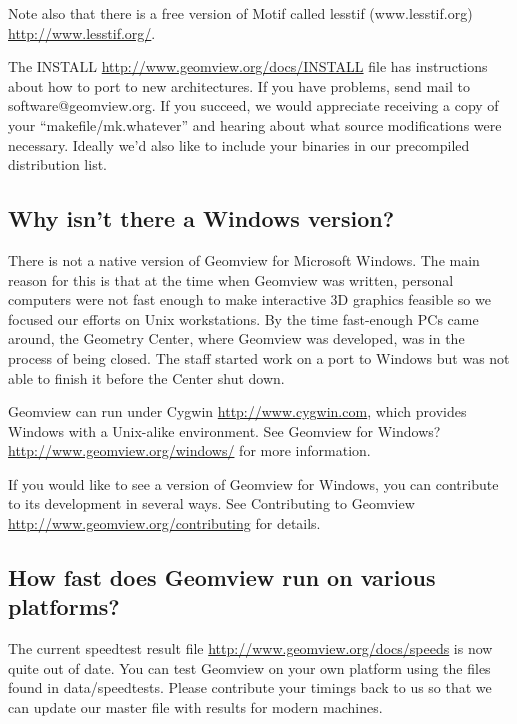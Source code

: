 \documentclass[12pt,a4paper]{article}
\begin{document}
        Note also that there is a free version of Motif called lesstif
        (www.lesstif.org) \url{http://www.lesstif.org/}.

        The INSTALL \url{http://www.geomview.org/docs/INSTALL} file has instructions
        about how to port to new architectures. If you have problems, send mail
        to software@geomview.org. If you succeed,
        we would appreciate receiving a copy of your ``makefile/mk.whatever'' and
        hearing about what source modifications were necessary. Ideally we'd
        also like to include your binaries in our precompiled distribution list.

    \subsection{Why isn't there a Windows version?}

        There is not a native version of Geomview for Microsoft Windows. The
        main reason for this is that at the time when Geomview was written,
        personal computers were not fast enough to make interactive 3D graphics
        feasible so we focused our efforts on Unix workstations. By the time
        fast-enough PCs came around, the Geometry Center, where Geomview was
        developed, was in the process of being closed. The staff started work on
        a port to Windows but was not able to finish it before the Center shut
        down.

        Geomview can run under Cygwin \url{http://www.cygwin.com}, which provides
        Windows with a Unix-alike environment. See Geomview for Windows?
        \url{http://www.geomview.org/windows/} for more information.

        If you would like to see a version of Geomview for Windows, you can
        contribute to its development in several ways. See Contributing to
        Geomview \url{http://www.geomview.org/contributing} for details.

    \subsection{How fast does Geomview run on various platforms?}

        The current speedtest result file \url{http://www.geomview.org/docs/speeds}
        is now quite out of date. You can test Geomview on your own platform
        using the files found in data/speedtests. Please contribute your timings
        back to us so that we can update our master file with results for modern
        machines.
\end{document}
